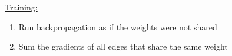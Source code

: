 












\underline{Training:}

\begin{enumerate}
  \item Run backpropagation as if the weights were not shared

  \item Sum the gradients of all edges that share the same weight

\end{enumerate}

